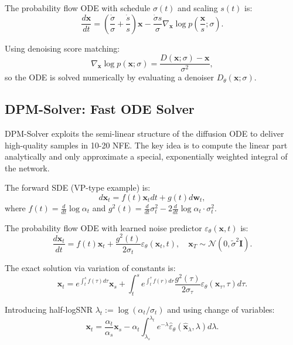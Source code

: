 The probability flow ODE with schedule $\sigma(t)$ and scaling $s(t)$ is:
\begin{equation}
\frac{d\mathbf{x}}{dt} = \left(\frac{\dot{\sigma}}{\sigma} + \frac{\dot{s}}{s}\right)\mathbf{x} - \frac{\dot{\sigma} s}{\sigma} \nabla_{\mathbf{x}}\log p\left(\frac{\mathbf{x}}{s};\sigma\right).
\end{equation}

Using denoising score matching:
\begin{equation}
\nabla_{\mathbf{x}}\log p(\mathbf{x};\sigma) = \frac{D(\mathbf{x};\sigma) - \mathbf{x}}{\sigma^2},
\end{equation}
so the ODE is solved numerically by evaluating a denoiser $D_\theta(\mathbf{x};\sigma)$.

\subsection{DPM-Solver: Fast ODE Solver}

DPM-Solver exploits the semi-linear structure of the diffusion ODE to deliver high-quality samples in 10-20 NFE. The key idea is to compute the linear part analytically and only approximate a special, exponentially weighted integral of the network.

The forward SDE (VP-type example) is:
\begin{equation}
d\mathbf{x}_t = f(t)\mathbf{x}_t dt + g(t) d\mathbf{w}_t,
\end{equation}
where $f(t) = \frac{d}{dt}\log \alpha_t$ and $g^2(t) = \frac{d}{dt}\sigma_t^2 - 2\frac{d}{dt}\log \alpha_t \cdot \sigma_t^2$.

The probability flow ODE with learned noise predictor $\varepsilon_\theta(\mathbf{x},t)$ is:
\begin{equation}
\frac{d\mathbf{x}_t}{dt} = f(t)\mathbf{x}_t + \frac{g^2(t)}{2\sigma_t} \varepsilon_\theta(\mathbf{x}_t,t), \quad \mathbf{x}_T \sim \mathcal{N}(0,\tilde{\sigma}^2\mathbf{I}).
\end{equation}

The exact solution via variation of constants is:
\begin{equation}
\mathbf{x}_t = e^{\int_t^s f(\tau) d\tau} \mathbf{x}_s + \int_t^s e^{\int_t^\tau f(r) dr} \frac{g^2(\tau)}{2\sigma_\tau} \varepsilon_\theta(\mathbf{x}_\tau,\tau) d\tau.
\end{equation}

Introducing half-logSNR $\lambda_t := \log(\alpha_t/\sigma_t)$ and using change of variables:
\begin{equation}
\mathbf{x}_t = \frac{\alpha_t}{\alpha_s} \mathbf{x}_s - \alpha_t \int_{\lambda_s}^{\lambda_t} e^{-\lambda} \hat{\varepsilon}_\theta(\hat{\mathbf{x}}_\lambda,\lambda) d\lambda.
\end{equation}


